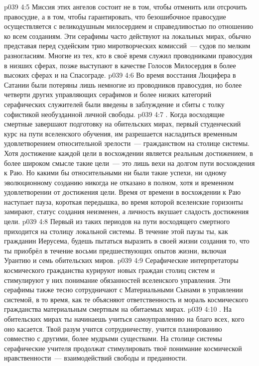 \vs p039 4:5 Миссия этих ангелов состоит не в том, чтобы отменить или отсрочить правосудие, а в том, чтобы гарантировать, что безошибочное правосудие осуществляется с великодушным милосердием и справедливостью по отношению ко всем созданиям. Эти серафимы часто действуют на локальных мирах, обычно представая перед судейским трио миротворческих комиссий~--- судов по мелким разногласиям. Многие из тех, кто в своё время служил проводниками правосудия в низших сферах, позже выступают в качестве Голосов Милосердия в более высоких сферах и на Спасограде.
\vs p039 4:6 Во время восстания Люцифера в Сатании были потеряны лишь немногие из проводников правосудия, но более четверти других управляющих серафимов и более низких категорий серафических служителей были введены в заблуждение и сбиты с толку софистикой необузданной личной свободы.
\vs p039 4:7 . Когда восходящие смертные завершают подготовку на обительских мирах, первый студенческий курс на пути вселенского обучения, им разрешается насладиться временным удовлетворением относительной зрелости~--- гражданством на столице системы. Хотя достижение каждой цели в восхождении является реальным достижением, в более широком смысле такие цели~--- это лишь вехи на долгом пути восхождения к Раю. Но какими бы относительными ни были такие успехи, ни одному эволюционному созданию никогда не отказано в полном, хотя и временном удовлетворении от достижения цели. Время от времени в восхождении к Раю наступает пауза, короткая передышка, во время которой вселенские горизонты замирают, статус создания неизменен, а личность вкушает сладость достижения цели.
\vs p039 4:8 Первый из таких периодов на пути восходящего смертного приходится на столицу локальной системы. В течение этой паузы ты, как гражданин Иерусема, будешь пытаться выразить в своей жизни создания то, что ты приобрёл в течение восьми предшествующих опытов жизни, включая Урантию и семь обительских миров.
\vs p039 4:9 Серафические интерпретаторы космического гражданства курируют новых граждан столиц систем и стимулируют у них понимание обязанностей вселенского управления. Эти серафимы также тесно сотрудничают с Материальными Сынами в управлении системой, в то время, как те объясняют ответственность и мораль космического гражданства материальным смертным на обитаемых мирах.
\vs p039 4:10 . На обительских мирах ты начинаешь учиться самоуправлению на благо всех, кого оно касается. Твой разум учится сотрудничеству, учится планированию совместно с другими, более мудрыми существами. На столице системы серафические учителя продолжат стимулировать твоё понимание космической нравственности~--- взаимодействий свободы и преданности.
